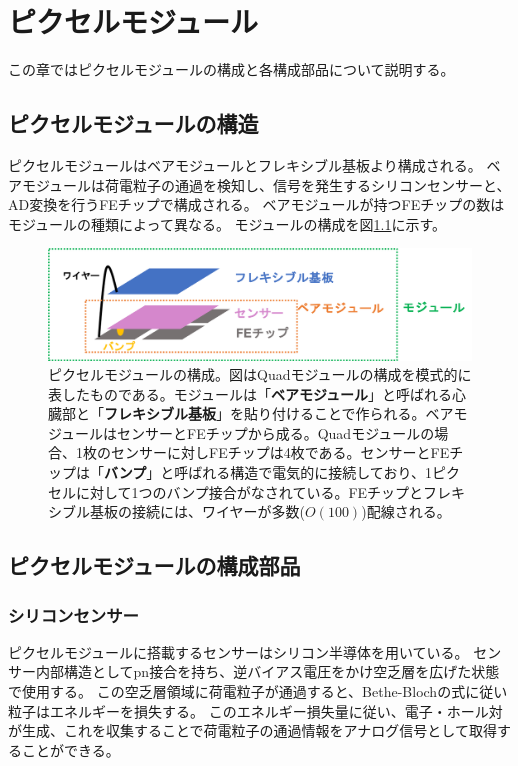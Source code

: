 \chapter{ピクセルモジュール}
この章ではピクセルモジュールの構成と各構成部品について説明する。

\section{ピクセルモジュールの構造}
ピクセルモジュールはベアモジュールとフレキシブル基板より構成される。
ベアモジュールは荷電粒子の通過を検知し、信号を発生するシリコンセンサーと、AD変換を行うFEチップで構成される。
ベアモジュールが持つFEチップの数はモジュールの種類によって異なる。
モジュールの構成を図\ref{module_configuration}に示す。

\begin{figure}[bpt]\centering
\includegraphics[width=14cm]{./module_configuration.png}
\caption[ピクセルモジュールの構成]{ピクセルモジュールの構成。図はQuadモジュールの構成を模式的に表したものである。モジュールは「\textbf{ベアモジュール}」と呼ばれる心臓部と「\textbf{フレキシブル基板}」を貼り付けることで作られる。ベアモジュールはセンサーとFEチップから成る。Quadモジュールの場合、1枚のセンサーに対しFEチップは4枚である。センサーとFEチップは「\textbf{バンプ}」と呼ばれる構造で電気的に接続しており、1ピクセルに対して1つのバンプ接合がなされている。FEチップとフレキシブル基板の接続には、ワイヤーが多数($O(100)$)配線される。}
\label{module_configuration}
\end{figure}

\section{ピクセルモジュールの構成部品}
\subsection{シリコンセンサー}
ピクセルモジュールに搭載するセンサーはシリコン半導体を用いている。
センサー内部構造としてpn接合を持ち、逆バイアス電圧をかけ空乏層を広げた状態で使用する\cite{2-1}。
この空乏層領域に荷電粒子が通過すると、Bethe-Blochの式\cite{2-3}に従い粒子はエネルギーを損失する。
このエネルギー損失量に従い、電子・ホール対が生成、これを収集することで荷電粒子の通過情報をアナログ信号として取得することができる。

